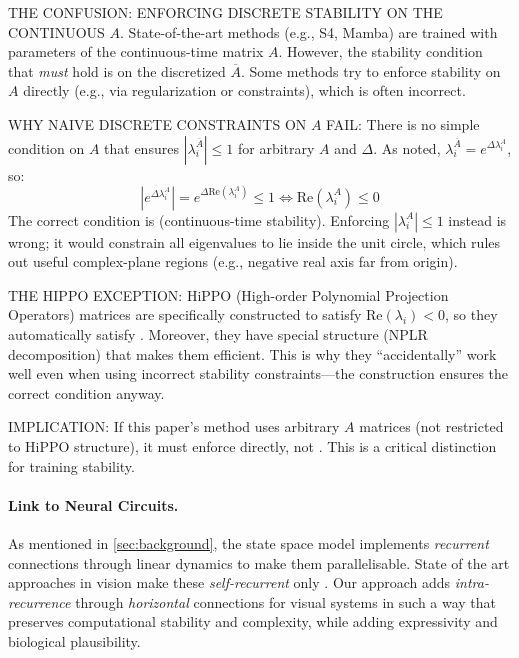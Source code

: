 \begin{ThomasAnnotation}
  THE CONFUSION: ENFORCING DISCRETE STABILITY ON THE CONTINUOUS $A$. State-of-the-art methods (e.g., S4, Mamba) are trained with parameters of the continuous-time matrix $A$. However, the stability condition that \emph{must} hold is  on the discretized $\overline{A}$. Some methods try to enforce stability on $A$ directly (e.g., via regularization or constraints), which is often incorrect.
  
  WHY NAIVE DISCRETE CONSTRAINTS ON $A$ FAIL: There is no simple condition on $A$ that ensures $|\lambda_i^{\overline{A}}| \leq 1$ for arbitrary $A$ and $\Delta$. As noted, $\lambda_i^{\overline{A}} = e^{\Delta \lambda_i^A}$, so:
  $$|e^{\Delta \lambda_i^A}| = e^{\Delta \mathrm{Re}(\lambda_i^A)} \leq 1 \iff \mathrm{Re}(\lambda_i^A) \leq 0$$
  The correct condition is  (continuous-time stability). Enforcing $|\lambda_i^A| \leq 1$ instead is wrong; it would constrain all eigenvalues to lie inside the unit circle, which rules out useful complex-plane regions (e.g., negative real axis far from origin).
  
  THE HIPPO EXCEPTION: HiPPO (High-order Polynomial Projection Operators) matrices are specifically constructed to satisfy $\mathrm{Re}(\lambda_i) < 0$, so they automatically satisfy . Moreover, they have special structure (NPLR decomposition) that makes them efficient. This is why they ``accidentally'' work well even when using incorrect stability constraints---the construction ensures the correct condition anyway.
  
  IMPLICATION: If this paper's method uses arbitrary $A$ matrices (not restricted to HiPPO structure), it must enforce  directly, not . This is a critical distinction for training stability.
\end{ThomasAnnotation}

\paragraph{Link to Neural Circuits.} As mentioned in \cref{sec:background}, the state space model implements \emph{recurrent} connections through linear dynamics to make them parallelisable. State of the art approaches in vision make these \emph{self-recurrent} only \citep{TODO}. Our approach adds \emph{intra-recurrence} through \emph{horizontal} connections for visual systems in such a way that preserves computational stability and complexity, while adding expressivity and biological plausibility.
